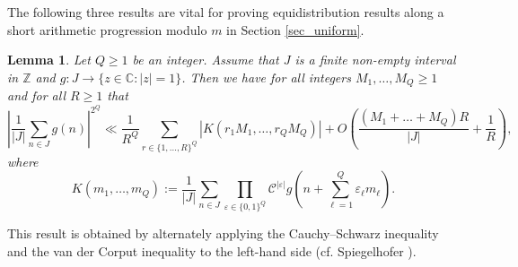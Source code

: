 \documentclass[12pt]{amsart}
\renewcommand{\geq}{\geqslant}
\newtheorem{lemma}[theorem]{Lemma}
\theoremstyle{definition}
\numberwithin{equation}{section}
\newcommand\ZZ{\mathbb{Z}}
\newcommand\CC{\mathbb{C}}
\numberwithin{equation}{section}
\begin{document}
The following three results are vital for proving equidistribution results along a short arithmetic progression modulo $m$ in Section \ref{sec_uniform}. 

\begin{lemma}\label{interated_van_der_corput}
	Let $Q\geq1$ be an integer. Assume that $J$ is a finite non-empty interval in $\ZZ$ and $g:J\rightarrow \{z\in \CC: |z| = 1 \}$. Then we have for all integers $M_1,\dots,M_{Q}\geq1$ and for all $R\geq 1$ that
	\[
	\left|\frac{1}{|J|}\sum_{n\in J}g(n)\right|^{2^Q}\ll \frac {1}{R^Q}\sum_{r\in\{1,\dots,R\}^Q}|K(r_1M_1,\dots,r_{Q}M_{Q})|+O\left(\frac{(M_1+\dots+M_{Q})R}{|J|}+\frac{1}{R}\right),
	\]
	where
	\[
	K(m_1,\dots,m_{Q}):=\frac{1}{|J|}\sum_{n\in J}\prod_{\varepsilon\in\{0,1\}^Q}\mathcal{C}^{|\varepsilon|}g\left(n+\sum_{\ell=1}^{Q}\varepsilon_{\ell}m_{\ell}\right).
	\]
\end{lemma}
This result is obtained by alternately applying the Cauchy--Schwarz inequality and the van der Corput inequality to the left-hand side (cf. Spiegelhofer \cite{Spiegelhofer2023}).
\end{document}
